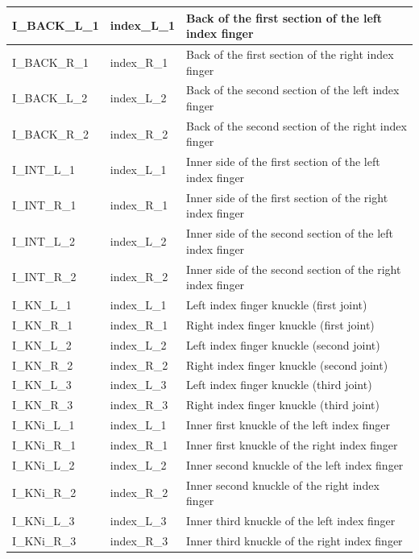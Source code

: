 \documentclass[../main.tex]{subfiles}
\begin{document}
\begin{longtable}{|p{2cm}|p{3cm}|p{5cm}|}
    I\_BACK\_L\_1 & index\_L\_1 & Back of the first section of the left index finger \\ \hline
    I\_BACK\_R\_1 & index\_R\_1 & Back of the first section of the right index finger \\ \hline
    I\_BACK\_L\_2 & index\_L\_2 & Back of the second section of the left index finger \\ \hline
    I\_BACK\_R\_2 & index\_R\_2 & Back of the second section of the right index finger \\ \hline
    I\_INT\_L\_1 & index\_L\_1 & Inner side of the first section of the left index finger \\ \hline
    I\_INT\_R\_1 & index\_R\_1 & Inner side of the first section of the right index finger \\ \hline
    I\_INT\_L\_2 & index\_L\_2 & Inner side of the second section of the left index finger \\ \hline
    I\_INT\_R\_2 & index\_R\_2 & Inner side of the second section of the right index finger \\ \hline
    I\_KN\_L\_1 & index\_L\_1 & Left index finger knuckle (first joint) \\ \hline
    I\_KN\_R\_1 & index\_R\_1 & Right index finger knuckle (first joint) \\ \hline
    I\_KN\_L\_2 & index\_L\_2 & Left index finger knuckle (second joint) \\ \hline
    I\_KN\_R\_2 & index\_R\_2 & Right index finger knuckle (second joint) \\ \hline
    I\_KN\_L\_3 & index\_L\_3 & Left index finger knuckle (third joint) \\ \hline
    I\_KN\_R\_3 & index\_R\_3 & Right index finger knuckle (third joint) \\ \hline
    I\_KNi\_L\_1 & index\_L\_1 & Inner first knuckle of the left index finger \\ \hline
    I\_KNi\_R\_1 & index\_R\_1 & Inner first knuckle of the right index finger \\ \hline
    I\_KNi\_L\_2 & index\_L\_2 & Inner second knuckle of the left index finger \\ \hline
    I\_KNi\_R\_2 & index\_R\_2 & Inner second knuckle of the right index finger \\ \hline
    I\_KNi\_L\_3 & index\_L\_3 & Inner third knuckle of the left index finger \\ \hline
    I\_KNi\_R\_3 & index\_R\_3 & Inner third knuckle of the right index finger \\ \hline

\end{longtable}
\end{document}
